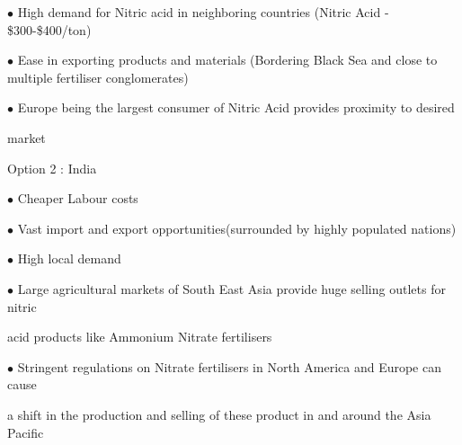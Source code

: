\documentclass[a4paper,portrait,12pt]{article}
\begin{document}
\begin{flushleft}
$\bullet$ High demand for Nitric acid in neighboring countries (Nitric Acid - \$300-\$400/ton)
\end{flushleft}


\begin{flushleft}
$\bullet$ Ease in exporting products and materials (Bordering Black Sea and close to multiple fertiliser conglomerates)
\end{flushleft}


\begin{flushleft}
$\bullet$ Europe being the largest consumer of Nitric Acid provides proximity to desired
\end{flushleft}


\begin{flushleft}
market
\end{flushleft}





\begin{flushleft}
Option 2 : India
\end{flushleft}


\begin{flushleft}
$\bullet$ Cheaper Labour costs
\end{flushleft}


\begin{flushleft}
$\bullet$ Vast import and export opportunities(surrounded by highly populated nations)
\end{flushleft}


\begin{flushleft}
$\bullet$ High local demand
\end{flushleft}


\begin{flushleft}
$\bullet$ Large agricultural markets of South East Asia provide huge selling outlets for nitric
\end{flushleft}


\begin{flushleft}
acid products like Ammonium Nitrate fertilisers
\end{flushleft}


\begin{flushleft}
$\bullet$ Stringent regulations on Nitrate fertilisers in North America and Europe can cause
\end{flushleft}


\begin{flushleft}
a shift in the production and selling of these product in and around the Asia Pacific
\end{flushleft}
\end{document}
